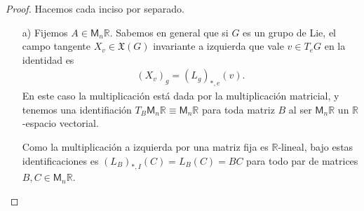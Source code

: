 \documentclass[11pt]{article}
\newcommand{\R}{\mathbb{R}}
\begin{document}
\begin{proof} Hacemos cada inciso por separado.
\begin{itemize}[listparindent = \parindent]
\item[a)] Fijemos $A \in \mathsf{M}_n\R$. Sabemos en general que si $G$ es un grupo de Lie, el campo tangente $X_v \in \mathfrak{X}(G)$ invariante a izquierda que vale $v \in T_eG$ en la identidad es
\begin{align}
(X_v)_g = (L_g)_{\ast,e}(v).
\end{align}
En este caso la multiplicaci\'on est\'a dada por la multiplicaci\'on matricial, y tenemos una identifiaci\'on $T_B\mathsf{M}_n\R \equiv \mathsf{M}_n\R$ para toda matriz $B$ al ser $\mathsf{M}_n\R$ un $\R$-espacio vectorial. 

Como la multiplicaci\'on a izquierda por una matriz fija es $\R$-lineal, bajo estas identificaciones es $(L_B)_{\ast,I}(C) = L_B(C) = BC$ para todo par de matrices $B,C \in \mathsf{M}_n\R$. 


\end{itemize}
\end{proof}
\end{document}

